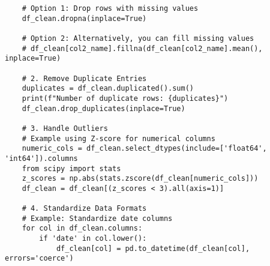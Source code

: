 \begin{tcolorbox}[colback=blue!5!white, colframe=blue!75!black, title=Failed Example \#4 Generated by o1-mini, text width=\textwidth]
\begin{verbatim}
    # Option 1: Drop rows with missing values
    df_clean.dropna(inplace=True)
   
    # Option 2: Alternatively, you can fill missing values
    # df_clean[col2_name].fillna(df_clean[col2_name].mean(), inplace=True)
   
    # 2. Remove Duplicate Entries
    duplicates = df_clean.duplicated().sum()
    print(f"Number of duplicate rows: {duplicates}")
    df_clean.drop_duplicates(inplace=True)
   
    # 3. Handle Outliers
    # Example using Z-score for numerical columns
    numeric_cols = df_clean.select_dtypes(include=['float64', 'int64']).columns
    from scipy import stats
    z_scores = np.abs(stats.zscore(df_clean[numeric_cols]))
    df_clean = df_clean[(z_scores < 3).all(axis=1)]
   
    # 4. Standardize Data Formats
    # Example: Standardize date columns
    for col in df_clean.columns:
        if 'date' in col.lower():
            df_clean[col] = pd.to_datetime(df_clean[col], errors='coerce')
\end{verbatim}
\end{tcolorbox}

